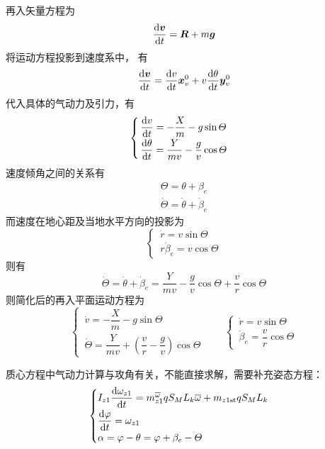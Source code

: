 再入矢量方程为
\begin{equation}
	\dfrac{{\rm{d}} \bm{v}}{{\rm{d}} t} = \bm{R} + m \bm{g}
\end{equation}
将运动方程投影到速度系中， 有
\begin{equation}
	\dfrac{{\rm{d}} \bm{v}}{{\rm{d}} t} = \dfrac{{\rm{d}} v}{{\rm{d}} t}\bm{x}_v^0 + v \dfrac{{\rm{d}} \theta}{{\rm{d}} t} \bm{y}_v^0
\end{equation}
代入具体的气动力及引力，有
\begin{equation}
	\begin{cases}
		\, \dfrac{{\rm{d}} v}{{\rm{d}} t} = - \dfrac{X}{m} - g \sin \varTheta \\[0.5em]
		\, \dfrac{{\rm{d}} \theta}{{\rm{d}} t} = \dfrac{Y}{m v} - \dfrac{g}{v} \cos \varTheta
	\end{cases}
\end{equation}
速度倾角之间的关系有
\begin{align}
	\varTheta = \theta + \beta_e \\
	\dot{\varTheta} = \dot{\theta} + \dot{\beta}_e
\end{align}
而速度在地心距及当地水平方向的投影为
\begin{equation}
	\begin{cases}
		\, \dot{r} = v \sin \varTheta \\
		\, r \dot{\beta}_e = v \cos \varTheta
	\end{cases}
\end{equation}
则有
\begin{equation}
	\dot{\varTheta} = \dot{\theta} + \dot{\beta}_e = \dfrac{Y}{m v} - \dfrac{g}{v}\cos \varTheta + \dfrac{v}{r}\cos \varTheta
\end{equation}
则简化后的再入平面运动方程为
\begin{equation}
	\begin{cases}
		\, \dot{v} = - \dfrac{X}{m} - g \sin \varTheta \\[0.5em]
		\, \dot{\varTheta} = \dfrac{Y}{mv} + \left(\dfrac{v}{r} - \dfrac{g}{v}\right)\cos \varTheta
	\end{cases}
	\qquad 
	\begin{cases}
		\, \dot{r} = v \sin \varTheta \\
		\, \dot{\beta}_e = \dfrac{v}{r} \cos \varTheta
	\end{cases}
\end{equation}

质心方程中气动力计算与攻角有关，不能直接求解，需要补充姿态方程：
\begin{equation}
	\begin{cases}
		I_{z1} \dfrac{{\rm{d}} \omega_{z1}}{{\rm{d}} t} = m_{z1}^{\overline{\omega}}qS_ML_k\overline{\omega} + m_{z1\text{st}}qS_ML_k \\[0.5em]
		\dfrac{{\rm{d}} \varphi}{{\rm{d}} t} = \omega_{z1} \\
		\alpha = \varphi - \theta = \varphi + \beta_e - \varTheta
	\end{cases}
\end{equation}

